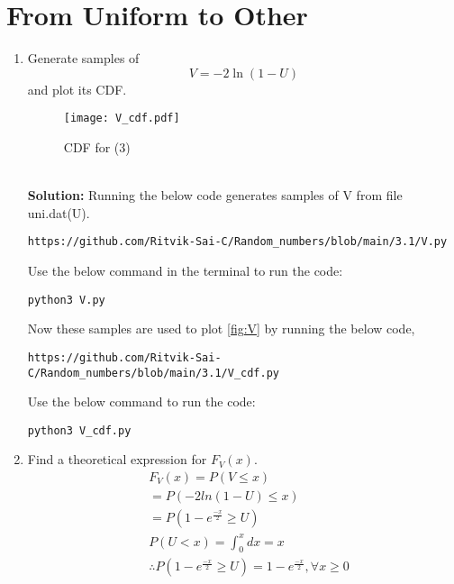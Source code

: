 \documentclass[journal,12pt,twocolumn]{IEEEtran}
\renewcommand\thesection{\arabic{section}}
\providecommand{\brak}[1]{\ensuremath{\left(#1\right)}}
\theoremstyle{remark}
\newcommand{\solution}{\noindent \textbf{Solution: }}
\numberwithin{equation}{section}
\begin{document}
\section{From Uniform to Other}
\begin{enumerate}[label=\thesection.\arabic*
,ref=\thesection.\theenumi]
%
\item
Generate samples of 
%
\begin{equation}
V = -2\ln\brak{1-U}
\end{equation}
%
and plot its CDF.\\ 
 \begin{figure}[h]
\texttt{[image: V\_cdf.pdf]}
\caption{CDF for (3)}
\label{fig:V}
\end{figure}
\\ 
\solution
Running the below code generates samples of V from file uni.dat(U).
\begin{lstlisting}
https://github.com/Ritvik-Sai-C/Random_numbers/blob/main/3.1/V.py
\end{lstlisting}
Use the below command in the terminal to run the code:
\begin{lstlisting}
python3 V.py
\end{lstlisting}
 
Now these samples are used to plot \eqref{fig:V} by running the below code,
\begin{lstlisting}
https://github.com/Ritvik-Sai-C/Random_numbers/blob/main/3.1/V_cdf.py
\end{lstlisting}
Use the below command to run the code:
\begin{lstlisting}
python3 V_cdf.py
\end{lstlisting}
\item Find a theoretical expression for $F_V(x)$.
\begin{align}
 &F_{V}(x)=P(V \leq x)\\
 &=P(-2 ln(1-U) \leq x)\\
 &=P(1-e^{\frac{-x}{2}} \geq U)\\
 &P(U<x)=\int_{0}^{x} dx=x\\
 &\therefore P(1-e^{\frac{-x}{2}} \geq U)=1-e^{\frac{-x}{2}}, \forall x\geq 0 \\ 
 \nonumber
 \end{align}
%
\end{enumerate}
\end{document}
